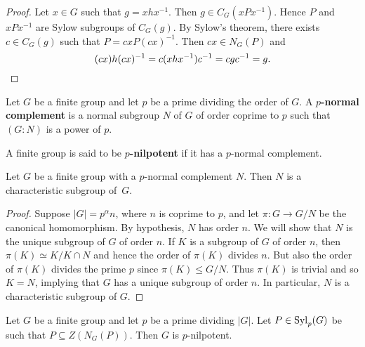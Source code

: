 \begin{proof}
	Let $x\in G$ such that $g=xhx^{-1}$. Then $g\in C_G(xPx^{-1})$. Hence $P$ and $xPx^{-1}$ are Sylow subgroups of $C_G(g)$. By Sylow's theorem, there exists $c\in C_G(g)$ such that $P=cxP(cx)^{-1}$. Then $cx\in N_G(P)$ and 
	\[
	(cx)h(cx)^{-1}=c(xhx^{-1})c^{-1}=cgc^{-1}=g.\qedhere
	\]
\end{proof}

\begin{definition}
	Let $G$ be a finite group and let $p$ be a prime dividing the order of $G$. A \textbf{$p$-normal complement} is a normal subgroup $N$ of $G$ of order coprime to $p$ such that $(G:N)$ is a power of $p$.
\end{definition}

\begin{definition}
	A finite group is said to be \textbf{$p$-nilpotent} 
    if it has a $p$-normal complement.
\end{definition}

\begin{proposition}
	Let $G$ be a finite group with a $p$-normal complement $N$. Then 
    $N$ is a characteristic subgroup of~$G$.
\end{proposition}

\begin{proof}
	Suppose $|G|=p^\alpha n$, where $n$ is coprime to $p$, and let $\pi\colon G\to G/N$ be the canonical homomorphism. By hypothesis, $N$ has order $n$. We will show that $N$ is the unique subgroup of $G$ of order $n$. If $K$ is a subgroup of $G$ of order $n$, then $\pi(K)\simeq K/K\cap N$ and hence the order of $\pi(K)$ divides $n$. But also the order of $\pi(K)$ divides the prime $p$ since $\pi(K)\leq G/N$. Thus $\pi(K)$ is trivial and so $K=N$, 
    implying that $G$ has a unique subgroup of order $n$. In particular, $N$ is a characteristic subgroup of $G$.
\end{proof}

\begin{theorem}
	\label{thm:Burnside:normal_complement}
	Let $G$ be a finite group and let $p$ be a prime dividing $|G|$. Let $P\in\mathrm{Syl}_p(G)$ be such that $P\subseteq Z(N_G(P))$. 
    Then $G$ is $p$-nilpotent.
\end{theorem}

